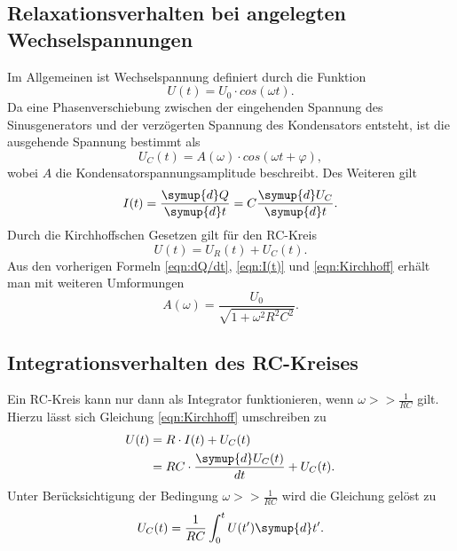 \subsection{Relaxationsverhalten bei angelegten Wechselspannungen}
Im Allgemeinen ist Wechselspannung definiert durch die Funktion
\begin{equation*}
    U(t)=U_0 \cdot cos(\omega t).
\end{equation*}
Da eine Phasenverschiebung zwischen der eingehenden Spannung des Sinusgenerators und der verzögerten Spannung des Kondensators entsteht,
ist die ausgehende Spannung bestimmt als
\begin{equation*}
    U_{C}(t)=A(\omega)\cdot cos(\omega t +\varphi),
\end{equation*}
wobei $A$ die Kondensatorspannungsamplitude beschreibt.
Des Weiteren gilt
\begin{equation}
    \label{eqn:I(t)}
    I(t)=\frac{\symup{d}Q}{\symup{d}t}=C\frac{\symup{d}U_C}{\symup{d}t}.
\end{equation}
Durch die Kirchhoffschen Gesetzen gilt für den RC-Kreis
\begin{equation}
    \label{eqn:Kirchhoff}
    U(t)=U_{R}(t)+U_{C}(t).
\end{equation}
Aus den vorherigen Formeln \autoref{eqn:dQ/dt}, \autoref{eqn:I(t)} und \autoref{eqn:Kirchhoff} erhält man mit weiteren Umformungen
\begin{equation}
    \label{eqn:Amplitude}
    A(\omega)=\frac{U_0}{\sqrt{1+\omega^2 R^2 C^2}}.
\end{equation}


\subsection{Integrationsverhalten des RC-Kreises}
Ein RC-Kreis kann nur dann als Integrator funktionieren, wenn $\omega >> \frac{1}{RC}$ gilt.
Hierzu lässt sich Gleichung \autoref{eqn:Kirchhoff} umschreiben zu
\begin{align*}
    U(t)&=R \cdot I(t)+U_{C}(t)\\
        &=RC\cdot \frac{\symup{d}U_{C}(t)}{dt}+U_{C}(t).
\end{align*}
Unter Berücksichtigung der Bedingung $\omega >>\frac{1}{RC}$ wird die Gleichung gelöst zu
\begin{equation}
    \label{eqn:Kondensatorspannung}
    U_{C}(t)=\frac{1}{RC}\int_{0}^{t} U(t')\symup{d}t'.
\end{equation}


\cite{sample}
